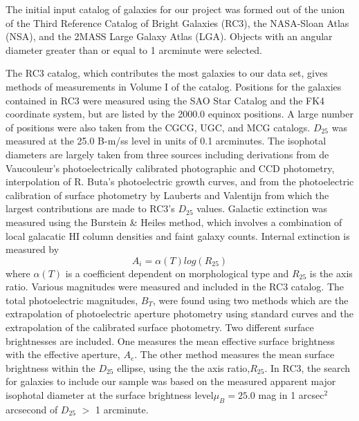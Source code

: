 \documentclass[12pt,preprint,pdftex]{aastex}
\begin{document}
The initial input catalog of galaxies for our project was formed out of the union of the Third
Reference Catalog of Bright Galaxies (RC3), the NASA-Sloan Atlas
(NSA), and the 2MASS Large Galaxy Atlas (LGA). Objects with an angular
diameter greater than or equal to 1 arcminute were selected. 

The RC3 catalog, which contributes the most galaxies to our data set,
gives methods of measurements in Volume I of the catalog. Positions
for the galaxies contained in RC3 were measured using the SAO Star
Catalog and the FK4 coordinate system, but are listed by the 2000.0
equinox positions. A large number of positions were also taken from
the CGCG, UGC, and MCG catalogs. $D_{25}$ was measured at the 25.0
B-m/ss level in units of 0.1 arcminutes. The isophotal diameters are
largely taken from three sources including derivations from de
Vaucouleur's photoelectrically calibrated photographic and CCD
photometry, interpolation of R. Buta's\citep{buta} photoelectric
growth curves, and from the photoelectric calibration of surface
photometry by Lauberts and Valentijn\citep{lauberts} from which the
largest contributions are made to RC3's $D_{25}$ values. Galactic
extinction was measured using the Burstein \& Heiles\citep{bh} method,
which involves a combination of local galacatic HI column densities
and faint galaxy counts. Internal extinction is measured
by \begin{equation} A_i= \alpha(T)log(R_{25}) \end{equation} where
$\alpha(T)$ is a coefficient dependent on morphological type and
$R_{25}$ is the axis ratio. Various magnitudes were measured and
included in the RC3 catalog. The total photoelectric magnitudes,
$B_T$, were found using two methods which are the extrapolation of
photoelectric aperture photometry using standard curves and the
extrapolation of the calibrated surface photometry. Two different
surface brightnesses are included. One measures the mean effective
surface brightness with the effective aperture, $A_e$. The other
method measures the mean surface brightness within the $D_{25}$
ellipse, using the the axis ratio,$R_{25}$\citep{rc3}.  In RC3, the
search for galaxies to include our sample was based on the measured
apparent major isophotal diameter at the surface brightness
level$\mu_{B}=25.0$ mag in 1 arcsec$^2$ arcsecond of $D_{25}$ $>$ 1
arcminute.
\end{document}
